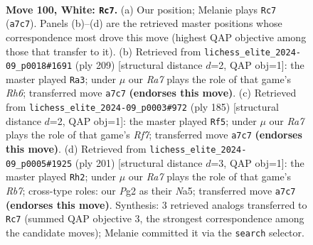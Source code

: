 \documentclass[11pt]{article}
\begin{document}
\clearpage

\begin{figure}[p]\centering
\begin{subfigure}{0.46\textwidth}\centering
\resizebox{\linewidth}{!}{%
\newchessgame
\chessboard[
  setfen={8/R7/4k3/8/5K2/1N6/6P1/7r w - - 64 100},
  showmover=false,
  pgfstyle=straightmove, color=movearrow, markmove={a7-c7}
]}
\caption{}
\end{subfigure}\hfill
\begin{subfigure}{0.46\textwidth}\centering
\resizebox{\linewidth}{!}{%
\newchessgame
\chessboard[
  setfen={5R2/8/4k3/2p5/8/7r/2K5/8 b - - 7 105},
  showmover=false,
  pgfstyle=straightmove, color=movearrow, markmove={h3-a3}
]}
\caption{}
\end{subfigure}
\\[4pt]
\begin{subfigure}{0.46\textwidth}\centering
\resizebox{\linewidth}{!}{%
\newchessgame
\chessboard[
  setfen={3k4/8/8/8/4R3/2K4p/5r2/8 b - - 17 93},
  showmover=false,
  pgfstyle=straightmove, color=movearrow, markmove={f2-f5}
]}
\caption{}
\end{subfigure}\hfill
\begin{subfigure}{0.46\textwidth}\centering
\resizebox{\linewidth}{!}{%
\newchessgame
\chessboard[
  setfen={8/4k3/8/n7/8/2R5/1r6/4K3 b - - 89 101},
  showmover=false,
  pgfstyle=straightmove, color=movearrow, markmove={b2-h2}
]}
\caption{}
\end{subfigure}
\caption{\textbf{Move 100, White: \texttt{Rc7}.} (a) Our position; Melanie plays \texttt{Rc7} (\texttt{a7c7}). Panels (b)--(d) are the retrieved master positions whose correspondence most drove this move (highest QAP objective among those that transfer to it). (b) Retrieved from \texttt{lichess\_elite\_2024-09\_p0018\#1691} (ply 209) [structural distance $d$=2, QAP obj=1]: the master played \texttt{Ra3}; under $\mu$ our \emph{Ra7} plays the role of that game's \emph{Rh6}; transferred move \texttt{a7c7} \textbf{(endorses this move)}. (c) Retrieved from \texttt{lichess\_elite\_2024-09\_p0003\#972} (ply 185) [structural distance $d$=2, QAP obj=1]: the master played \texttt{Rf5}; under $\mu$ our \emph{Ra7} plays the role of that game's \emph{Rf7}; transferred move \texttt{a7c7} \textbf{(endorses this move)}. (d) Retrieved from \texttt{lichess\_elite\_2024-09\_p0005\#1925} (ply 201) [structural distance $d$=3, QAP obj=1]: the master played \texttt{Rh2}; under $\mu$ our \emph{Ra7} plays the role of that game's \emph{Rb7}; cross-type roles: our \emph{P}g2 as their \emph{N}a5; transferred move \texttt{a7c7} \textbf{(endorses this move)}. Synthesis: 3 retrieved analogs transferred to \texttt{Rc7} (summed QAP objective 3, the strongest correspondence among the candidate moves); Melanie committed it via the \texttt{search} selector.}
\label{fig:thought-m198}
\end{figure}
\end{document}
